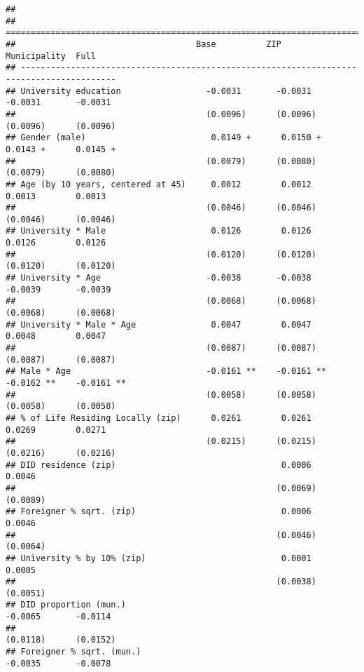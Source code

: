 \documentclass[
]{article}
\begin{document}
\begin{verbatim}
## 
## =========================================================================================
##                                    Base          ZIP           Municipality  Full        
## -----------------------------------------------------------------------------------------
## University education                 -0.0031       -0.0031       -0.0031       -0.0031   
##                                      (0.0096)      (0.0096)      (0.0096)      (0.0096)  
## Gender (male)                         0.0149 +      0.0150 +      0.0143 +      0.0145 + 
##                                      (0.0079)      (0.0080)      (0.0079)      (0.0080)  
## Age (by 10 years, centered at 45)     0.0012        0.0012        0.0013        0.0013   
##                                      (0.0046)      (0.0046)      (0.0046)      (0.0046)  
## University * Male                     0.0126        0.0126        0.0126        0.0126   
##                                      (0.0120)      (0.0120)      (0.0120)      (0.0120)  
## University * Age                     -0.0038       -0.0038       -0.0039       -0.0039   
##                                      (0.0068)      (0.0068)      (0.0068)      (0.0068)  
## University * Male * Age               0.0047        0.0047        0.0048        0.0047   
##                                      (0.0087)      (0.0087)      (0.0087)      (0.0087)  
## Male * Age                           -0.0161 **    -0.0161 **    -0.0162 **    -0.0161 **
##                                      (0.0058)      (0.0058)      (0.0058)      (0.0058)  
## % of Life Residing Locally (zip)      0.0261        0.0261        0.0269        0.0271   
##                                      (0.0215)      (0.0215)      (0.0216)      (0.0216)  
## DID residence (zip)                                 0.0006                      0.0046   
##                                                    (0.0069)                    (0.0089)  
## Foreigner % sqrt. (zip)                             0.0006                      0.0046   
##                                                    (0.0046)                    (0.0064)  
## University % by 10% (zip)                           0.0001                      0.0005   
##                                                    (0.0038)                    (0.0051)  
## DID proportion (mun.)                                            -0.0065       -0.0114   
##                                                                  (0.0118)      (0.0152)  
## Foreigner % sqrt. (mun.)                                         -0.0035       -0.0078   

\end{verbatim}
\end{document}
